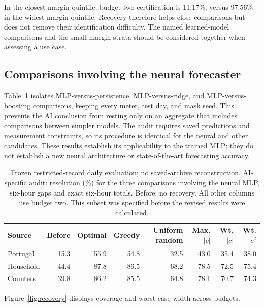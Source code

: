 \documentclass[12pt]{article}
\begin{document}
In the closest-margin quintile, budget-two certification is
11.17\%, versus
97.56\% in the widest-margin quintile.
Recovery therefore helps close comparisons but does not remove their
identification difficulty. The named learned-model comparisons and the
small-margin strata should be considered together when assessing a use case.
\FloatBarrier


\subsection{Comparisons involving the neural forecaster}\label{app:neural-pairs}
Table~\ref{tab:neural} isolates MLP-versus-persistence, MLP-versus-ridge,
and MLP-versus-boosting comparisons, keeping every meter, test day, and
mask seed. This prevents the AI conclusion from resting only on an
aggregate that includes comparisons between simpler models. The audit
requires saved predictions and measurement constraints, so its procedure
is identical for the neural and other candidates. These results establish
its applicability to the trained MLP; they do not establish a new neural
architecture or state-of-the-art forecasting accuracy.
\begin{table}[htbp]
\centering\normalsize\setlength{\tabcolsep}{4pt}
\caption{Frozen restricted-record daily evaluation; no saved-archive reconstruction. AI-specific audit: resolution (\%) for the three comparisons involving the neural MLP, six-hour gaps and exact six-hour totals. Before: no recovery. All other columns use budget two. This subset was specified before the revised results were calculated.}
\label{tab:neural}
\begin{tabular}{lrrrrrrr}
\toprule
Source & Before & Optimal & Greedy & Uniform random & Max. $|c|$ & Wt. $|c|$ & Wt. $c^2$\\
\midrule
Portugal & 15.3 & 55.9 & 54.8 & 32.5 & 43.0 & 35.4 & 38.0\\
Household & 44.4 & 87.8 & 86.5 & 68.2 & 78.5 & 72.5 & 75.4\\
Counters & 39.8 & 86.2 & 85.5 & 64.8 & 78.1 & 70.7 & 74.3\\
\bottomrule
\end{tabular}
\end{table}
Figure~\ref{fig:recovery} displays coverage and worst-case width across budgets.
\end{document}
